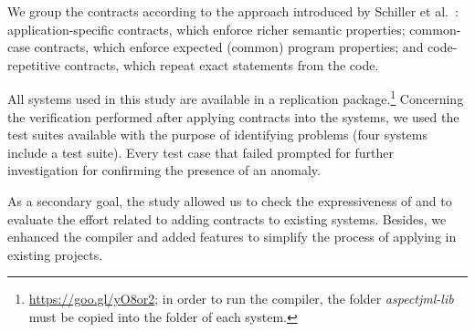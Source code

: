 We group the contracts according to
the approach introduced by Schiller et al.~\cite{typeContracts}: application-specific contracts, which enforce richer semantic properties;
common-case contracts, which enforce
expected (common) program properties;
and code-repetitive contracts, which repeat exact statements from the code.

All systems used in this study are available in a replication
package.\footnote{\url{https://goo.gl/yO8or2}; in order to run the
\contractjdoc{} compiler, the folder \textit{aspectjml-lib} must be copied into the folder of each system.}
Concerning the verification performed after applying \contractjdoc{} contracts into the systems,
we used the test suites available with the purpose of identifying problems
(four systems include a test suite).
Every test case that failed prompted for further investigation for confirming the presence of an anomaly.

As a secondary goal, the study allowed us to check the expressiveness of \contractjdoc{} and to
evaluate the effort related to adding contracts to existing systems.
Besides, we enhanced the compiler and added features to simplify
the process of applying \contractjdoc{} in existing projects.

